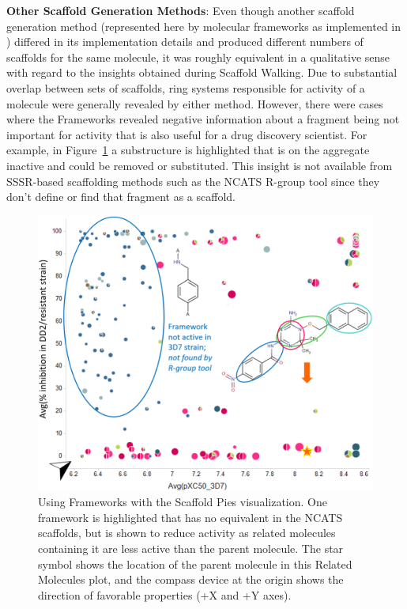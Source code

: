 \documentclass[11pt,letterpaper,biochem]{article}
\newcommand*\fref[1]{Figure~\ref{fig:#1}}
\begin{document}
{\bf Other Scaffold Generation Methods}: Even though another scaffold generation method (represented here by molecular frameworks as implemented in \cite{Harper2004DDclus}) differed in its implementation details and produced different numbers of scaffolds for the same molecule, it was roughly equivalent in a qualitative sense with regard to the insights obtained during Scaffold Walking. Due to substantial overlap between sets of scaffolds, ring systems responsible for activity of a molecule were generally revealed by either method. However, there were cases where the Frameworks revealed negative information about a fragment being not important for activity that is also useful for a drug discovery scientist. For example, in \fref{frameswalk} a substructure is highlighted that is on the aggregate inactive and could be removed or substituted. This insight is not available from SSSR-based scaffolding methods such as the NCATS R-group tool since they don't define or find that fragment as a scaffold.

\begin{figure}
\includegraphics[width=5in]{../fig/mol1_frames_scafpie_v2.png}
\caption{Using Frameworks with the Scaffold Pies visualization. One framework is highlighted that has no equivalent in the NCATS scaffolds, but is shown to reduce activity as related molecules containing it are less active than the parent molecule.   The star symbol shows the location of the parent molecule in this Related Molecules plot, and the compass device at the origin shows the direction of favorable properties (+X and +Y axes).}      
\label{fig:frameswalk}
\end{figure}
\end{document}

